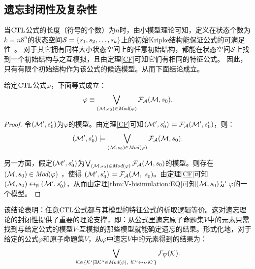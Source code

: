 \subsection{遗忘封闭性及复杂性}\label{chapter06:sec:close}
当$\textrm{CTL}$公式的长度（符号的个数）为$n$时，由小模型理论可知，定义在状态个数为$k=n8^n$的状态空间${\cal S}=\{s_1,s_2,\dots, s_k\}$上的初始Kripke结构能保证公式的可满足性~\cite{DBLP:journals/jcss/EmersonH85}。
对于其它拥有同样大小状态空间上的任意初始结构，都能在状态空间${\cal S}$上找到一个初始结构与之互模拟，且由定理\ref{CF}可知它们有相同的特征公式。
因此，只有有限个初始结构作为该公式的候选模型。从而下面结论成立。

\begin{lemma}\label{lem:models:formula}
	给定$\textrm{CTL}$公式$\varphi$，下面等式成立：
	\begin{equation*}
		\varphi\equiv \bigvee_{({\cal M}, s_0)\in\textit{Mod}(\varphi)}{\cal F}_{\cal A}({\cal M}, s_0).
	\end{equation*}
\end{lemma}
\begin{proof}
	令$({\cal M}', s_0')$为$\varphi$的模型。由定理\ref{CF}可知$({\cal M}', s_0') \models {\cal F}_{{\cal A}}({\cal M}', s_0')$，则：
	$$({\cal M}', s_0') \models \bigvee_{({\cal M}, s_0)\in \textit{Mod}(\varphi)} {\cal F}_{{\cal A}}({\cal M}, s_0).$$
	
	另一方面，假定$({\cal M}', s_0')$为$\bigvee_{({\cal M}, s_0)\in \textit{Mod}(\varphi)} {\cal F}_{{\cal A}}({\cal M}, s_0)$的模型。则存在$({\cal M}, s_0)\in \textit{Mod}(\varphi)$ ，使得 $({\cal M}', s_0') \models {\cal F}_{{\cal A}}({\cal M},$ $s_0)$。由定理\ref{CF}可知$({\cal M}, s_0) \leftrightarrow_{\emptyset} ({\cal M}', s_0')$，从而由定理\ref{thm:V-bisimulation:EQ}可知$({\cal M}, s_0)$是 $\varphi$的一个模型。
\end{proof}

该结论表明：任意$\textrm{CTL}$公式都与其模型的特征公式的析取逻辑等价。这对遗忘理论的封闭性提供了重要的理论支撑，即：从公式里遗忘原子命题集$V$中的元素只需找到与给定公式的模型$V$-互模拟的那些模型就能确定遗忘的结果。形式化地，对于给定的公式$\varphi$和原子命题集$V$，从$\varphi$中遗忘$V$中的元素得到的结果为：
\begin{equation*}
	\bigvee_{{\cal K}\in  \{{\cal K}'\mid \exists {\cal K}''\in\textit{Mod}(\phi),\ {\cal K}''\leftrightarrow_V{\cal K}'\}} {\cal F}_{\overline V}({\cal K}).
\end{equation*}




